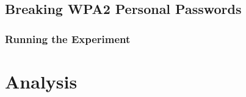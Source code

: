 \documentclass[12pt,a4paper]{article}
\begin{document}
 \subsection{Breaking WPA2 Personal Passwords }
	\subsubsection{Running the Experiment}

\section{Analysis}


\end{document}
